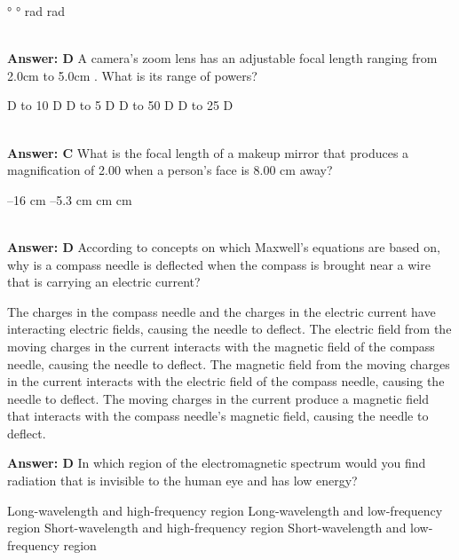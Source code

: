\documentclass[12pt,addpoints]{exam}
\begin{document}
{{{\begin{questions}
\begin{oneparchoices}
						°
						°
						 rad
						 rad
					\end{oneparchoices}
					\\ \textbf{Answer: D}
					\question A camera’s zoom lens has an adjustable focal length ranging from 2.0cm to 5.0cm . What is its range of powers?\\
					\begin{oneparchoices}
						 D to 10 D
						 D to 5 D
						 D to 50 D
						 D to 25 D
					\end{oneparchoices}
					\\ \textbf{Answer: C}
					\question What is the focal length of a makeup mirror that produces a magnification of 2.00 when a person’s face is 8.00 cm away? \\
					\begin{oneparchoices}
						\choice –16 cm
						\choice –5.3 cm
						\choice 5.3 cm
						\choice 16 cm
					\end{oneparchoices}
					\\ \textbf{Answer: D}
					\question According to concepts on which Maxwell’s equations are based on, why is a compass needle is deflected when the compass is brought near a wire that is carrying an electric current?
					\begin{choices}
						\choice The charges in the compass needle and the charges in the electric current have interacting electric fields, causing the needle to deflect.
						\choice The electric field from the moving charges in the current interacts with the magnetic field of the compass needle, causing the needle to deflect.
						\choice The magnetic field from the moving charges in the current interacts with the electric field of the compass needle, causing the needle to deflect.
						\choice The moving charges in the current produce a magnetic field that interacts with the compass needle’s magnetic field, causing the needle to deflect.
					\end{choices} 
					\textbf{Answer: D}
					\question In which region of the electromagnetic spectrum would you find radiation that is invisible to the human eye and has low energy? \\
					\begin{oneparchoices}
						\choice Long-wavelength and high-frequency region
						\choice Long-wavelength and low-frequency region
						\choice Short-wavelength and high-frequency region
						\choice Short-wavelength and low-frequency region

\end{oneparchoices}
\end{questions}}}}
\end{document}
